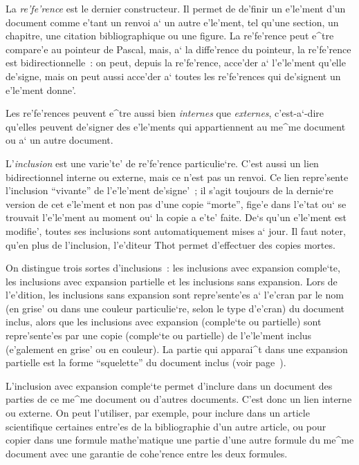 La {\em re'fe'rence} est le dernier constructeur. Il permet de de'finir un
e'le'ment d'un document comme e'tant un renvoi a` un autre e'le'ment,
tel qu'une section, un chapitre, une citation bibliographique ou une figure.
La re'fe'rence peut e^tre compare'e au pointeur de Pascal, mais, a` la
diffe'rence du pointeur, la re'fe'rence est bidirectionnelle~: on peut,
depuis la re'fe'rence, acce'der a` l'e'le'ment qu'elle de'signe, mais on peut
aussi acce'der a` toutes les re'fe'rences qui de'signent un e'le'ment donne'.

Les re'fe'rences peuvent e^tre aussi bien {\em internes} que {\em externes},
c'est-a`-dire qu'elles peuvent de'signer des e'le'ments qui appartiennent
au me^me document ou a` un autre document.

\label{inclusion}
L'{\em inclusion} est une varie'te' de re'fe'rence particulie`re.
C'est aussi un lien bidirectionnel interne ou externe, mais ce
n'est pas un renvoi. Ce lien repre'sente l'inclusion ``vivante'' de
l'e'le'ment de'signe'~; il s'agit toujours de la dernie`re version
de cet e'le'ment et non pas d'une copie ``morte'', fige'e dans
l'e'tat ou` se trouvait l'e'le'ment au moment ou` la copie a e'te'
faite. De`s qu'un e'le'ment est modifie', toutes ses inclusions
sont automatiquement mises a` jour. Il faut noter, qu'en plus de
l'inclusion, l'e'diteur Thot permet d'effectuer des copies mortes.

On distingue trois sortes d'inclusions~: les inclusions avec
expansion comple`te, les inclusions avec expansion partielle
et les inclusions sans expansion. Lors de l'e'dition, les
inclusions sans expansion sont repre'sente'es a` l'e'cran par le nom
(en grise' ou dans une couleur particulie`re, selon le type d'e'cran)
du document inclus, alors que les inclusions avec
expansion (comple`te ou partielle) sont repre'sente'es par une copie
(comple`te ou partielle) de l'e'le'ment inclus (e'galement en grise'
ou en couleur). La partie qui apparai^t dans une expansion partielle
est la forme ``squelette'' du document inclus (voir
page~\pageref{squelette}).

L'inclusion avec expansion comple`te permet d'inclure dans un document
des parties de ce me^me document ou d'autres documents. C'est donc
un lien interne ou externe. On peut l'utiliser, par exemple, pour inclure
dans un article scientifique certaines entre'es de la bibliographie
d'un autre article, ou pour copier dans une formule mathe'matique une
partie d'une autre formule du me^me document avec une garantie de
cohe'rence entre les deux formules.

